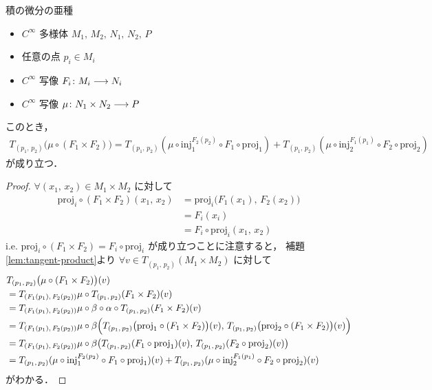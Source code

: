 \documentclass[TQFT_main]{subfiles}
\begin{document}
\begin{mylem}[label=lem:diff-product]{積の微分の亜種}
    \begin{itemize}
        \item $C^\infty$ 多様体 $M_1,\, M_2,\, N_1,\, N_2,\, P$
        \item 任意の点 $p_i \in M_i$
        \item $C^\infty$ 写像 $F_i \colon M_i \longrightarrow N_i$
        \item $C^\infty$ 写像 $\mu \colon N_1 \times N_2 \longrightarrow P$
    \end{itemize}
    このとき，
    \begin{align}
        T_{(p_1,\, p_2)} \bigl( \mu \circ (F_1 \times F_2) \bigr) 
        = T_{(p_1,\, p_2)} (\mu \circ \mathrm{inj}_1^{F_2(p_2)} \circ F_1 \circ \mathrm{proj}_1) + T_{(p_1,\, p_2)} (\mu \circ \mathrm{inj}_2^{F_1(p_1)} \circ F_2 \circ \mathrm{proj}_2)
    \end{align}
    が成り立つ．
\end{mylem}

\begin{proof}
    $\forall (x_1,\, x_2) \in M_1 \times M_2$ に対して
    \begin{align}
        \mathrm{proj}_i \circ (F_1 \times F_2)(x_1,\, x_2) 
        &= \mathrm{proj}_i \bigl( F_1(x_1),\, F_2(x_2) \bigr) \\
        &= F_i(x_i) \\
        &= F_i \circ \mathrm{proj}_i (x_1,\, x_2)
    \end{align}
    i.e. $\mathrm{proj}_i \circ (F_1 \times F_2) = F_i \circ \mathrm{proj}_i$ が成り立つことに注意すると，
    補題\ref{lem:tangent-product}より $\forall v \in T_{(p_1,\, p_2)}(M_1 \times M_2)$ に対して
    \begin{align}
        &T_{(p_1,\, p_2)} \bigl( \mu \circ (F_1 \times F_2) \bigr)(v) \\
        &= T_{(F_1(p_1),\, F_2(p_2))} \mu \circ T_{(p_1,\, p_2)}(F_1 \times F_2)(v) \\
        &= T_{(F_1(p_1),\, F_2(p_2))} \mu \circ \beta \circ \alpha \circ T_{(p_1,\, p_2)}(F_1 \times F_2)(v) \\
        &= T_{(F_1(p_1),\, F_2(p_2))} \mu \circ \beta \Bigl(T_{(p_1,\, p_2)} \bigl(\mathrm{proj}_1 \circ (F_1 \times F_2)\bigr)(v) ,\, T_{(p_1,\, p_2)}\bigl(\mathrm{proj}_2 \circ (F_1 \times F_2)\bigr)(v) \Bigr) \\
        &= T_{(F_1(p_1),\, F_2(p_2))} \mu \circ \beta \bigl(T_{(p_1,\, p_2)} (F_1 \circ \mathrm{proj}_1)(v) ,\, T_{(p_1,\, p_2)}(F_2 \circ \mathrm{proj}_2)(v) \bigr) \\
        &= T_{(p_1,\, p_2)} (\mu \circ \mathrm{inj}_1^{F_2(p_2)} \circ F_1 \circ \mathrm{proj}_1)(v) + T_{(p_1,\, p_2)} (\mu \circ \mathrm{inj}_2^{F_1(p_1)} \circ F_2 \circ \mathrm{proj}_2)(v)
    \end{align}
    がわかる．
\end{proof}
\end{document}

